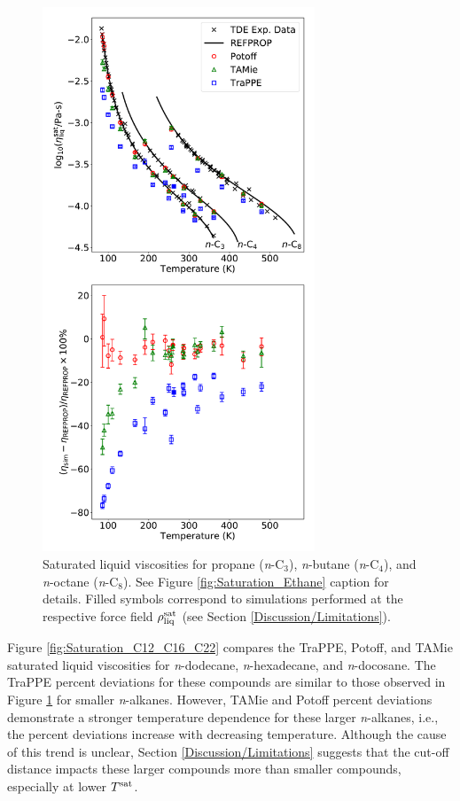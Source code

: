 \documentclass[preprint,review,12pt]{elsarticle}
\begin{document}
	
	\begin{figure}[htb!]
		\centering
		\includegraphics[width=3.2in]{compare_force_fields_short_normal.pdf}
		\caption{Saturated liquid viscosities for propane (\textit{n}-C$_{3}$), \textit{n}-butane (\textit{n}-C$_{4}$), and \textit{n}-octane (\textit{n}-C$_{8}$). See Figure \ref{fig:Saturation_Ethane} caption for details. Filled symbols correspond to simulations performed at the respective force field $\rho_{\rm liq}^{\rm sat}$ (see Section \ref{Discussion/Limitations}).}
		\label{fig:Saturation_C3_C4_C8}
	\end{figure} 
	
	Figure \ref{fig:Saturation_C12_C16_C22} compares the TraPPE, Potoff, and TAMie saturated liquid viscosities for \textit{n}-dodecane, \textit{n}-hexadecane, and \textit{n}-docosane. The TraPPE percent deviations for these compounds are similar to those observed in Figure \ref{fig:Saturation_C3_C4_C8} for smaller \textit{n}-alkanes. However, TAMie and Potoff percent deviations demonstrate a stronger temperature dependence for these larger \textit{n}-alkanes, i.e., the percent deviations increase with decreasing temperature. Although the cause of this trend is unclear, Section \ref{Discussion/Limitations} suggests that the cut-off distance impacts these larger compounds more than smaller compounds, especially at lower $T^{\rm sat}$.
	
\end{document}
